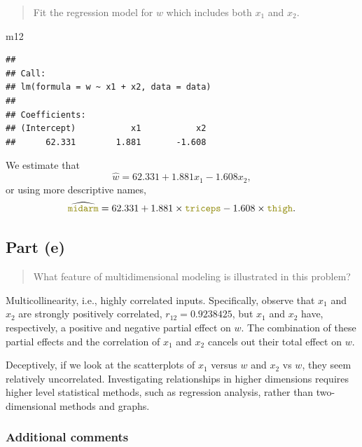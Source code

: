 \documentclass[
]{article}
\newenvironment{Shaded}{\begin{snugshade}}{\end{snugshade}}
\newcommand{\NormalTok}[1]{#1}
\begin{document}
\begin{quote}
Fit the regression model for \(w\) which includes both \(x_1\) and
\(x_2\).
\end{quote}

\begin{Shaded}
\begin{Highlighting}[]
\NormalTok{m12}
\end{Highlighting}
\end{Shaded}

\begin{verbatim}
## 
## Call:
## lm(formula = w ~ x1 + x2, data = data)
## 
## Coefficients:
## (Intercept)           x1           x2  
##      62.331        1.881       -1.608
\end{verbatim}

We estimate that \[
  \hat{w} = 62.331 + 1.881 x_1 - 1.608 x_2,
\] or using more descriptive names, \[
    \widehat{\texttt{\color{olive}midarm}} = 62.331 + 1.881 \times \texttt{\color{olive}triceps} - 1.608 \times \texttt{\color{olive}thigh}.
\]

\hypertarget{part-e}{%
\subsection{Part (e)}\label{part-e}}

\begin{quote}
What feature of multidimensional modeling is illustrated in this
problem?
\end{quote}

Multicollinearity, i.e., highly correlated inputs. Specifically, observe
that \(x_1\) and \(x_2\) are strongly positively correlated,
\(r_{1 2} = 0.9238425\), but \(x_1\) and \(x_2\) have, respectively, a
positive and negative partial effect on \(w\). The combination of these
partial effects and the correlation of \(x_1\) and \(x_2\) cancels out
their total effect on \(w\).

Deceptively, if we look at the scatterplots of \(x_1\) versus \(w\) and
\(x_2\) vs \(w\), they seem relatively uncorrelated. Investigating
relationships in higher dimensions requires higher level statistical
methods, such as regression analysis, rather than two-dimensional
methods and graphs.

\hypertarget{additional-comments}{%
\subsubsection{Additional comments}\label{additional-comments}}
\end{document}
